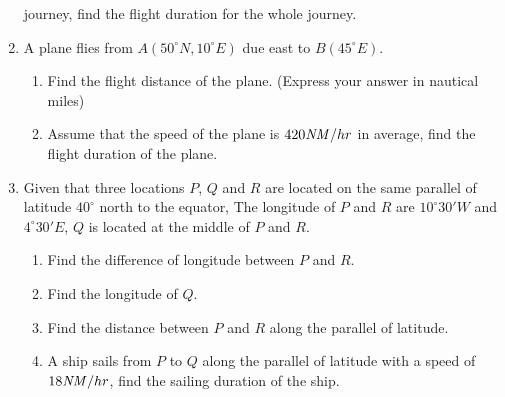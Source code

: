 \documentclass{report}
\begin{document}
\begin{multicols}{2}
\begin{enumerate}
              journey, find the flight duration for the whole journey.
        \item A plane flies from $A(50^\circ N, 10^\circ E)$ due east to $B(45^\circ E)$.
              \begin{enumerate}
                  \item Find the flight distance of the plane. (Express your answer in nautical miles)
                  \item Assume that the speed of the plane is $420\text{\emph{NM}}/hr$ in average, find
                        the flight duration of the plane.
              \end{enumerate}
        \item Given that three locations $P$, $Q$ and $R$ are located on the same parallel of
              latitude $40^\circ$ north to the equator, The longitude of $P$ and $R$ are
              $10^\circ 30' W$ and $4^\circ 30' E$, $Q$ is located at the middle of $P$ and
              $R$.
              \begin{enumerate}
                  \item Find the difference of longitude between $P$ and $R$.
                  \item Find the longitude of $Q$.
                  \item Find the distance between $P$ and $R$ along the parallel of latitude.
                  \item A ship sails from $P$ to $Q$ along the parallel of latitude with a speed of
                        $18\text{\emph{NM}}/hr$, find the sailing duration of the ship.
              \end{enumerate}
    \end{enumerate}
\end{multicols}
\end{document}
